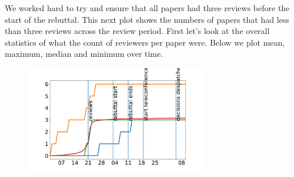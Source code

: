 We worked hard to try and ensure that all papers had three reviews
before the start of the rebuttal. This next plot shows the numbers of
papers that had less than three reviews across the review period. First
let's look at the overall statistics of what the count of reviewers per
paper were. Below we plot mean, maximum, median and minimum over time.

\begin{Shaded}
\begin{Highlighting}[]
\OperatorTok{=}\OperatorTok{=}\NormalTok{)}
\OperatorTok{=}\NormalTok{ lastseen[}\NormalTok{]}

\OperatorTok{=}\OperatorTok{=}\OperatorTok{=}
\OperatorTok{=}\OperatorTok{=}\OperatorTok{=}\NormalTok{)}
\OperatorTok{=}\NormalTok{)}
\OperatorTok{=}\NormalTok{)    }
\OperatorTok{=}
\NormalTok{        review\_count[col][review\_count.index}\OperatorTok{\textgreater{}}\NormalTok{lastseen[col]] }\OperatorTok{=}
        
\OperatorTok{=}
\end{Highlighting}
\end{Shaded}

\begin{figure}[htb]
\includegraphics[width=0.70\textwidth]{diagrams/neurips/number-of-reviews-over-time.pdf}


\caption{}
\label{number-of-reviews-over-time}
\end{figure}

